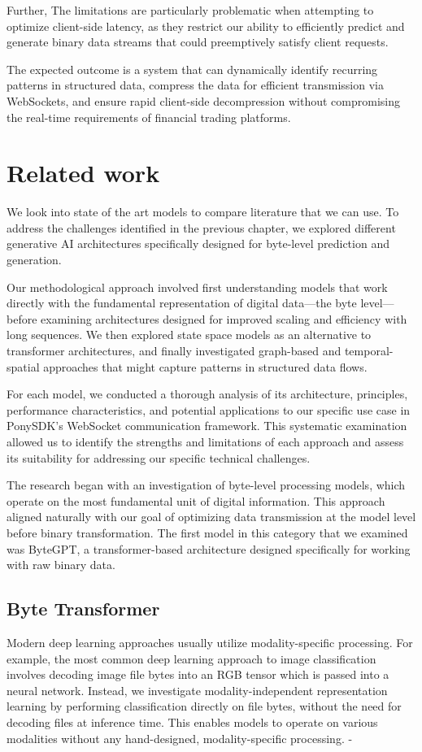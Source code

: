 \documentclass[a4paper, 11pt, twoside, openright]{report}
\begin{document}
\noindent
Further, The limitations are particularly problematic when attempting to optimize client-side latency, as they restrict our ability to efficiently predict and generate binary data streams that could preemptively satisfy client requests.
\bigskip

\noindent
The expected outcome is a system that can dynamically identify recurring patterns in structured data, compress the data for efficient transmission via WebSockets, and ensure rapid client-side decompression without compromising the real-time requirements of financial trading platforms.

\chapter{Related work}
We look into state of the art models to compare literature that we can use.
To address the challenges identified in the previous chapter, we explored different generative AI architectures specifically designed for byte-level prediction and generation.

Our methodological approach involved first understanding models that work directly with the fundamental representation of digital data—the byte level—before examining architectures designed for improved scaling and efficiency with long sequences. We then explored state space models as an alternative to transformer architectures, and finally investigated graph-based and temporal-spatial approaches that might capture patterns in structured data flows.

For each model, we conducted a thorough analysis of its architecture, principles, performance characteristics, and potential applications to our specific use case in PonySDK's WebSocket communication framework. This systematic examination allowed us to identify the strengths and limitations of each approach and assess its suitability for addressing our specific technical challenges.

The research began with an investigation of byte-level processing models, which operate on the most fundamental unit of digital information. This approach aligned naturally with our goal of optimizing data transmission at the model level before binary transformation. The first model in this category that we examined was ByteGPT, a transformer-based architecture designed specifically for working with raw binary data.

\section{Byte Transformer}
Modern deep learning approaches usually utilize modality-specific processing. For example,
the most common deep learning approach to image classification involves decoding image
file bytes into an RGB tensor which is passed into a neural network. Instead, we investigate modality-independent representation learning by performing classification directly on
file bytes, without the need for decoding files at inference time. This enables models to operate on various modalities without any hand-designed, modality-specific processing. - %
\end{document}
